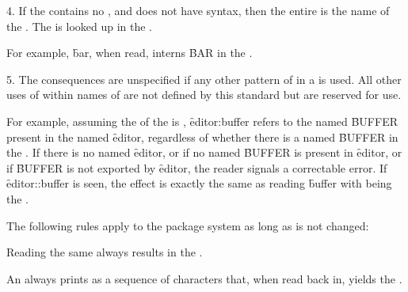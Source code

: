 \item{4.}
If the  contains no , 
and does not have  syntax,
then the entire  is the name of the .
The  is looked up in the .

For example, 
\f{bar}, when read, interns \f{BAR} in the .

\item{5.}
The consequences are unspecified if any other pattern of 
in a  is used.
All other uses of  within names of  
are not defined by this standard 
but are reserved for  use.
\endlist

For example,
assuming the  of the  is ,
\f{editor:buffer} refers to the  
named \f{BUFFER} present in the  named \f{editor},
regardless of whether there is a  named \f{BUFFER} in
the .  If there is no  named
\f{editor}, or if no  named \f{BUFFER}
is present in \f{editor}, or if \f{BUFFER} is not exported by
\f{editor}, the reader signals
a correctable error.
If \f{editor::buffer} is seen, the effect is exactly the same as
reading \f{buffer} with  being the .

\endsubSection%


The following rules apply to the package system as long as 
 is not changed:

\beginlist
{}


Reading the same  
always results in the  .


An  always prints as a sequence of characters that, 
when read back in, yields the  .

